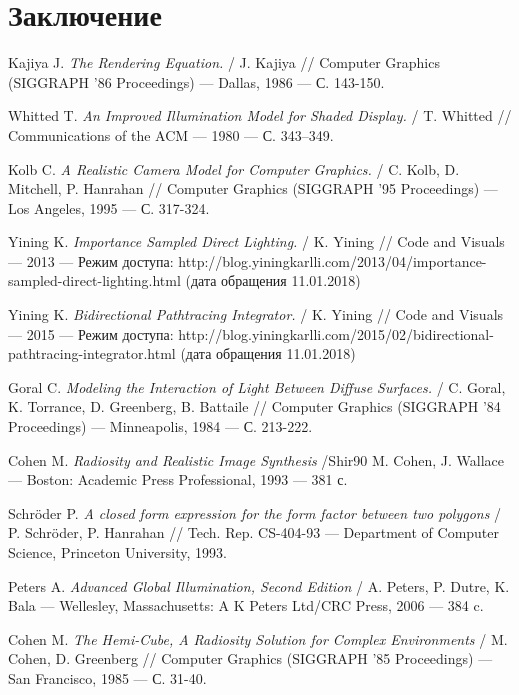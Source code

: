 \documentclass[12pt]{article}
\begin{document}
\newpage\section*{Заключение}

\newpage
\begin{thebibliography}{9} %
Kajiya J.
\textit{The Rendering Equation.} / 
J. Kajiya //
Computer Graphics (SIGGRAPH ’86 Proceedings) --- Dallas, 1986 --- С. 143-150.

Whitted T.
\textit{An Improved Illumination Model for Shaded Display.} / 
T. Whitted //
Communications of the ACM --- 1980 --- С. 343–349.

Kolb C.
\textit{A Realistic Camera Model for Computer Graphics.} /
C. Kolb, D. Mitchell, P. Hanrahan //
Computer Graphics (SIGGRAPH ’95 Proceedings) --- Los Angeles, 1995 --- С. 317-324.

Yining K.
\textit{Importance Sampled Direct Lighting.} / 
K. Yining //
Code and Visuals --- 2013 --- Режим доступа: http://blog.yiningkarlli.com/2013/04/importance-sampled-direct-lighting.html (дата обращения 11.01.2018)

Yining K.
\textit{Bidirectional Pathtracing Integrator.} / 
K. Yining //
Code and Visuals --- 2015 --- Режим доступа: http://blog.yiningkarlli.com/2015/02/bidirectional-pathtracing-integrator.html (дата обращения 11.01.2018)

Goral C.
\textit{Modeling the Interaction of Light Between Diffuse Surfaces.} /
C. Goral, K. Torrance, D. Greenberg, B. Battaile //
Computer Graphics (SIGGRAPH ’84 Proceedings) --- Minneapolis, 1984 --- С. 213-222.

Cohen M.
\textit{Radiosity and Realistic Image Synthesis} /Shir90
M. Cohen, J. Wallace
--- Boston: Academic Press Professional, 1993 --- 381 с.

Schr{\"o}der P.
\textit{A closed form expression for the form factor between two polygons} /
P. Schr{\"o}der, P. Hanrahan //
Tech. Rep. CS-404-93 --- Department of Computer Science, Princeton University, 1993.

Peters A.
\textit{Advanced Global Illumination, Second Edition} /
A. Peters, P. Dutre, K. Bala
--- Wellesley, Massachusetts: A K Peters Ltd/CRC Press, 2006 --- 384 c.

Cohen M.
\textit{The Hemi-Cube, A Radiosity Solution for Complex Environments} /
M. Cohen, D. Greenberg //
Computer Graphics (SIGGRAPH ’85 Proceedings) --- San Francisco, 1985 --- С. 31-40.


\end{thebibliography}
\end{document}
